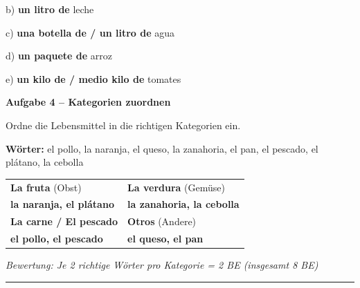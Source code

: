 \documentclass[11pt, a4paper]{article}
\newcommand{\fachfarbe}{spanisch}
\newcommand{\punktebox}[1]{\hfill\fbox{\small \_/#1}}
\newcommand{\lsg}[1]{\textcolor{loesung}{\textbf{#1}}}
\newenvironment{aufgabe}[1]{%
    \needspace{5\baselineskip}%
    \nopagebreak[4]%
    \vspace{10pt}
    \noindent\textbf{\textcolor{\fachfarbe}{Aufgabe #1}}
    \nopagebreak[4]%
    \vspace{5pt}
    \nopagebreak[4]%
    \begin{list}{}{\leftmargin=0pt}
    \item[]
}{%
    \end{list}
}
\begin{document}
\noindent
b) \lsg{un litro de} leche

\vspace{0.8em}

\noindent
c) \lsg{una botella de / un litro de} agua

\vspace{0.8em}

\noindent
d) \lsg{un paquete de} arroz

\vspace{0.8em}

\noindent
e) \lsg{un kilo de / medio kilo de} tomates

\vspace{15pt}


\begin{aufgabe}{4 -- Kategorien zuordnen}
Ordne die Lebensmittel in die richtigen Kategorien ein. \punktebox{8}
\end{aufgabe}

\begin{hinweis}
\textbf{Wörter:} el pollo, la naranja, el queso, la zanahoria, el pan, el pescado, el plátano, la cebolla
\end{hinweis}

\vspace{0.5em}

\noindent
\begin{tabularx}{\textwidth}{|X|X|}
\hline
\textbf{La fruta} (Obst) & \textbf{La verdura} (Gemüse) \\
\lsg{la naranja, el plátano} & \lsg{la zanahoria, la cebolla} \\[1em]
\hline
\textbf{La carne / El pescado} & \textbf{Otros} (Andere) \\
\lsg{el pollo, el pescado} & \lsg{el queso, el pan} \\[1em]
\hline
\end{tabularx}

\vspace{0.5em}

\textit{Bewertung: Je 2 richtige Wörter pro Kategorie = 2 BE (insgesamt 8 BE)}


\vspace{25pt}
\hrule
\vspace{10pt}
\end{document}
